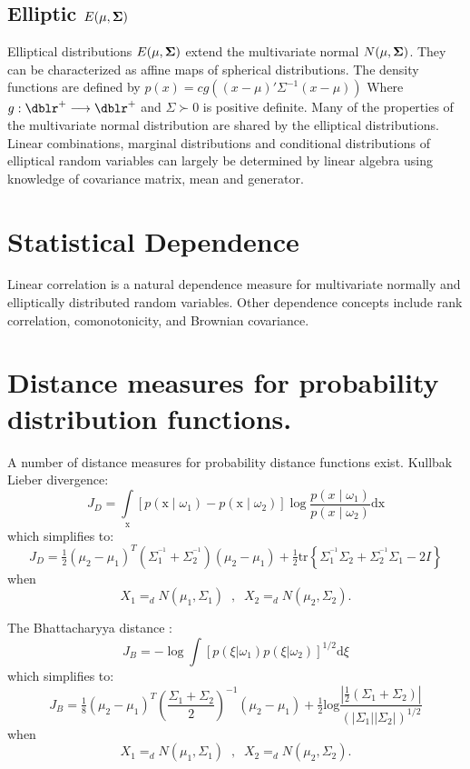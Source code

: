 \subsection{Elliptic $E(\mathbf{\mu},\mathbf{\Sigma})$}
Elliptical distributions $E(\mathbf{\mu},\mathbf{\Sigma})$ extend the multivariate normal $N(\mathbf{\mu},\mathbf{\Sigma})$.  They can be characterized as affine maps of spherical distributions. The density functions
are defined by $p(x) = c g(  (x-\mu)' \Sigma^{-1} (x-\mu) )$  Where $g : \dblr^{+} \longrightarrow \dblr^{+}$ and $ \Sigma \succ 0$ is positive definite.
Many of the properties of the multivariate normal distribution
are shared by the elliptical distributions. Linear combinations, marginal distributions and conditional distributions of elliptical random variables can largely be determined by linear algebra using knowledge of covariance
matrix, mean and generator.

\section{Statistical Dependence}
Linear correlation is a natural dependence measure for
multivariate normally and elliptically distributed random variables.  Other dependence concepts include rank correlation, comonotonicity, and Brownian covariance.


\section{Distance measures for probability distribution functions.}
A number of distance measures for probability distance
functions exist.  Kullbak Lieber divergence:\[ J_D  =
\int\limits_{\text{x}} {[p({\text{x}}\mid\omega_1 ) -
p({\text{x}}\mid\omega_2 )]}
     \log \frac{{p(x\mid\omega_1 )}} {{p(x\mid\omega_2 )}}{\text{dx}}\]
which simplifies to:\[ J_D  = \tfrac{1} {2}\left( {\mu _2  -
\mu _1 } \right)^T  \left( {\Sigma _1^{^{ - 1} }  + \Sigma
_2^{^{ - 1} } } \right)\left( {\mu _2  - \mu _1 } \right) +
\tfrac{1} {2}{\text{tr}}\left\{ {\Sigma _1^{^{ - 1} } \Sigma _2
+ \Sigma _2^{^{ - 1} } \Sigma _1  - 2I} \right\}\] when \[X_1
=_d N(\mu_1,\Sigma_1) \;\; , \;\; X_2 =_d N(\mu_2,\Sigma_2).\]

The Bhattacharyya distance :
\[J_B  =  - \log \int {\left[ {p(\xi \left| {\omega _1 }
\right.)p(\xi \left| {\omega _2 } \right.)} \right]} ^{{1/2}}
{\text{d}}\xi
\] which simplifies to: \[
J_B  = \tfrac{1} {8}\left( {\mu _2  - \mu _1 } \right)^T \left(
{\frac{{\Sigma _1  + \Sigma _2 }} {2}} \right)^{ - 1} \left(
{\mu _2  - \mu _1 } \right) + \tfrac{1}
{2}{\text{log}}\frac{{\left| {\tfrac{1} {2}(\Sigma _1  + \Sigma
_2 )} \right|}} {{( {\left| {\Sigma _1 } \right|\left| {\Sigma
_2 } \right|} )^{1/2} }}
\] when \[X_1 =_d  N(\mu_1,\Sigma_1) \;\; , \;\; X_2 =_d
N(\mu_2,\Sigma_2).\]

